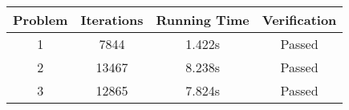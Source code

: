\begin{tabular}{c|ccc}
\toprule
 Problem & Iterations & Running Time & Verification \\
\midrule
       1 &       7844 &       1.422s &       Passed \\
       2 &      13467 &       8.238s &       Passed \\
       3 &      12865 &       7.824s &       Passed \\
\bottomrule
\end{tabular}
